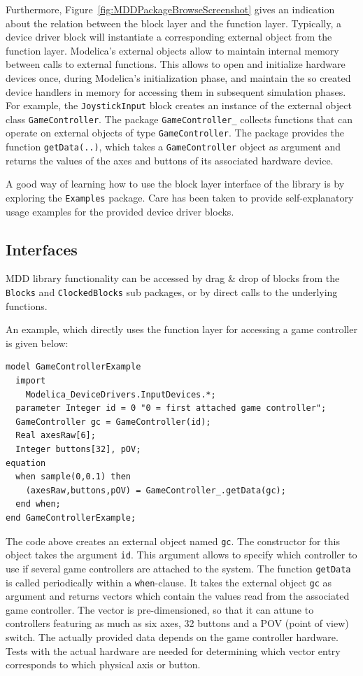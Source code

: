 \documentclass{resources/modelica}
\newcommand{\modelica}[1]{\lstinline[language=modelica]|#1|}
\begin{document}
Furthermore, Figure~\ref{fig:MDDPackageBrowseScreenshot} gives an indication
about the relation between the block layer and the function layer. Typically, a
device driver block will instantiate a corresponding external object from the
function layer. Modelica's external objects allow to maintain internal memory
between calls to external functions. This allows to open and initialize hardware
devices once, during Modelica's initialization phase, and maintain the so
created device handlers in memory for accessing them in subsequent simulation phases.
For example, the \modelica{JoystickInput} block creates an instance of the
external object class \mbox{\modelica{GameController}.} The package
\modelica{GameController_} collects functions that can operate on external
objects of type \modelica{GameController}. The package provides the function
\modelica{getData(..)}, which takes a \modelica{GameController} object as
argument and returns the values of the axes and buttons of its associated
hardware device.

A good way of learning how to use the block layer interface of the library is by
exploring the \modelica{Examples} package. Care has been taken to provide
self-explanatory usage examples for the provided device driver blocks.

\subsection{Interfaces}

MDD library functionality can be accessed by drag \& drop of blocks
from the \modelica{Blocks} and \modelica{ClockedBlocks} sub packages, or by
direct calls to the underlying functions.

An example, which directly uses the function layer for accessing a
game controller is given below:
\begin{lstlisting}[language=modelica]
model GameControllerExample
  import
    Modelica_DeviceDrivers.InputDevices.*;
  parameter Integer id = 0 "0 = first attached game controller";
  GameController gc = GameController(id);
  Real axesRaw[6];
  Integer buttons[32], pOV;
equation
  when sample(0,0.1) then
    (axesRaw,buttons,pOV) = GameController_.getData(gc);
  end when;
end GameControllerExample;
\end{lstlisting}

The code above creates an external object named \mbox{\modelica{gc}.} The
constructor for this object takes the argument \mbox{\modelica{id}.} This
argument allows to specify which controller to use if several game controllers are attached to the
system. The function \modelica{getData} is called periodically within a
\modelica{when}-clause. It takes the external object \modelica{gc} as
argument and returns vectors which contain the values read from the
associated game controller. The vector is pre-dimensioned, so that it can attune
to controllers featuring as much as six axes, 32 buttons and a POV (point of
view) switch. The actually provided data depends on the game
controller hardware. Tests with the actual hardware are needed for determining
which vector entry corresponds to which physical axis or button.
\end{document}
